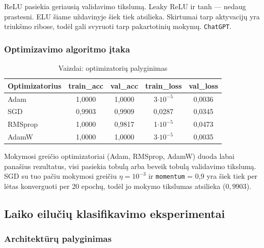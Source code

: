 \documentclass[]{VUMIFTemplateClass}
\begin{document}
ReLU pasiekia geriausią validavimo tikslumą. Leaky ReLU ir tanh --- nedaug prastesni. ELU šiame uždavinyje šiek tiek atsilieka. Skirtumai tarp aktyvacijų yra triukšmo ribose, todėl gali svyruoti tarp pakartotinių mokymų. \texttt{ChatGPT}.

\subsubsection{Optimizavimo algoritmo įtaka}

\begin{table}[H]
    \centering
    \caption{Vaizdai: optimizatorių palyginimas}
    \label{tab:img_opt}
    \begin{tabular}{|l|c|c|c|c|}
        \hline
        \textbf{Optimizatorius} & \textbf{train\_acc} & \textbf{val\_acc} & \textbf{train\_loss} & \textbf{val\_loss}\\
        \hline
        Adam     & 1{,}0000 & 1{,}0000 & 3$\cdot 10^{-5}$ & 0{,}0036\\
        \hline
        SGD      & 0{,}9903 & 0{,}9909 & 0{,}0287 & 0{,}0345\\
        \hline
        RMSprop  & 1{,}0000 & 0{,}9817 & 1$\cdot 10^{-5}$ & 0{,}0473\\
        \hline
        AdamW    & 1{,}0000 & 1{,}0000 & 3$\cdot 10^{-5}$ & 0{,}0035\\
        \hline
    \end{tabular}
\end{table}

Mokymosi greičio optimizatoriai (Adam, RMSprop, AdamW) duoda labai panašius rezultatus, visi pasiekia tobulą arba beveik tobulą validavimo tikslumą. SGD su tuo pačiu mokymosi greičiu \(\eta = 10^{-3}\) ir \texttt{momentum} = 0{,}9 yra šiek tiek per lėtas konverguoti per 20 epochų, todėl jo mokymo tikslumas atsilieka (\(0{,}9903\)).

\subsection{Laiko eilučių klasifikavimo eksperimentai}

\subsubsection{Architektūrų palyginimas}
\end{document}

